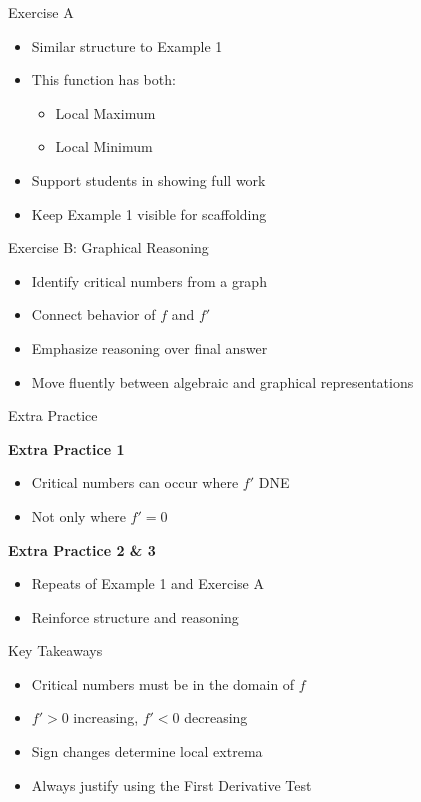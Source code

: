 \documentclass[dvipsnames]{beamer}
\begin{document}
\begin{frame}{Exercise A}
\begin{itemize}
\item Similar structure to Example 1
\item This function has both:
\begin{itemize}
\item Local Maximum
\item Local Minimum
\end{itemize}
\item Support students in showing full work
\item Keep Example 1 visible for scaffolding
\end{itemize}
\end{frame}

\begin{frame}{Exercise B: Graphical Reasoning}
\begin{itemize}
\item Identify critical numbers from a graph
\item Connect behavior of $f$ and $f'$
\item Emphasize reasoning over final answer
\item Move fluently between algebraic and graphical representations
\end{itemize}
\end{frame}

\begin{frame}{Extra Practice}

\textbf{\color{blue}Extra Practice 1}
\begin{itemize}
\item Critical numbers can occur where $f'$ DNE
\item Not only where $f'=0$
\end{itemize}

\vspace{0.5em}

\textbf{\color{blue}Extra Practice 2 \& 3}
\begin{itemize}
\item Repeats of Example 1 and Exercise A
\item Reinforce structure and reasoning
\end{itemize}
\end{frame}

\begin{frame}{Key Takeaways}
\begin{itemize}
\item Critical numbers must be in the domain of $f$
\item $f'>0$ increasing, $f'<0$ decreasing
\item Sign changes determine local extrema
\item Always justify using the First Derivative Test
\end{itemize}
\end{frame}
\end{document}
